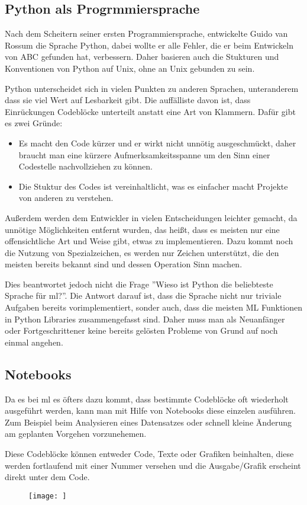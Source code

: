\subsection{Python als Progrmmiersprache}

Nach dem Scheitern seiner ersten Programmiersprache, entwickelte Guido van Rossum die Sprache Python, dabei wollte er alle Fehler, die er beim Entwickeln von ABC gefunden hat, verbessern. Daher basieren auch die Stukturen und Konventionen von Python auf Unix, ohne an Unix gebunden zu sein. 

Python unterscheidet sich in vielen Punkten zu anderen Sprachen, unteranderem dass sie viel Wert auf Lesbarkeit gibt. Die auffälliste davon ist, dass Einrückungen Codeblöcke unterteilt anstatt eine Art von Klammern. Dafür gibt es zwei Gründe:

\begin{itemize}
    \item Es macht den Code kürzer und er wirkt nicht unnötig ausgeschmückt, daher braucht man eine kürzere Aufmerksamkeitsspanne um den Sinn einer Codestelle nachvollziehen zu können.
    \item Die Stuktur des Codes ist vereinhaltlicht, was es einfacher macht Projekte von anderen zu verstehen.
\end{itemize}

Außerdem werden dem Entwickler in vielen Entscheidungen leichter gemacht, da unnötige Möglichkeiten entfernt wurden, das heißt, dass es meisten nur eine offensichtliche Art und Weise gibt, etwas zu implementieren. Dazu kommt noch die Nutzung von Spezialzeichen, es werden nur Zeichen unterstützt, die den meisten bereits bekannt sind und dessen Operation Sinn machen. \cite{PythonGVR:online}

Dies beantwortet jedoch nicht die Frage ''Wieso ist Python die beliebteste Sprache für \gls{ml}?''. Die Antwort darauf ist, dass die Sprache nicht nur triviale Aufgaben bereits vorimplementiert, sonder auch, dass die meisten ML Funktionen in Python Libraries zusammengefasst sind. Daher muss man als Neuanfänger oder Fortgeschrittener keine bereits gelösten Probleme von Grund auf noch einmal angehen.

\subsection{Notebooks}

Da es bei \gls{ml} es öfters dazu kommt, dass bestimmte Codeblöcke oft wiederholt ausgeführt werden, kann man mit Hilfe von Notebooks diese einzelen ausführen. Zum Beispiel beim Analysieren eines Datensatzes oder schnell kleine Änderung am geplanten Vorgehen vorzunehemen.

Diese Codeblöcke können entweder Code, Texte oder Grafiken beinhalten, diese werden fortlaufend mit einer Nummer versehen und die Ausgabe/Grafik erscheint direkt unter dem Code.

\begin{figure}
    \centering
    \texttt{[image: ]}
\end{figure}